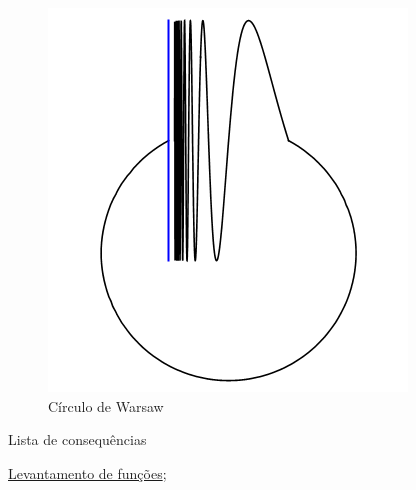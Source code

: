 \begin{figure}[t]
    \centering
    \includegraphics[width=0.4\linewidth]{warsaw.png}
    \caption{Círculo de Warsaw}
    \label{fig:enter-label}
\end{figure}

\begin{titlemize}{Lista de consequências}
	\item \hyperref[levantamento-de-funções-prop]{Levantamento de funções};\\ %
\end{titlemize}
